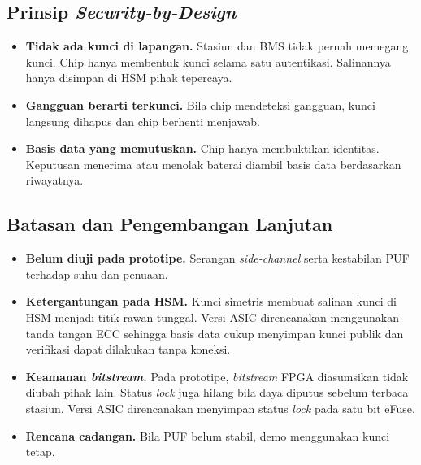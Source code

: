 \documentclass[11pt,a4paper]{article}
\begin{document}
\subsection{Prinsip \emph{Security-by-Design}}

\begin{itemize}
  \item \textbf{Tidak ada kunci di lapangan.} Stasiun dan BMS tidak pernah memegang kunci. Chip hanya membentuk kunci selama satu autentikasi. Salinannya hanya disimpan di HSM pihak tepercaya.
  \item \textbf{Gangguan berarti terkunci.} Bila chip mendeteksi gangguan, kunci langsung dihapus dan chip berhenti menjawab.
  \item \textbf{Basis data yang memutuskan.} Chip hanya membuktikan identitas. Keputusan menerima atau menolak baterai diambil basis data berdasarkan riwayatnya.
\end{itemize}

\subsection{Batasan dan Pengembangan Lanjutan}

\begin{itemize}
  \item \textbf{Belum diuji pada prototipe.} Serangan \emph{side-channel} serta kestabilan PUF terhadap suhu dan penuaan.
  \item \textbf{Ketergantungan pada HSM.} Kunci simetris membuat salinan kunci di HSM menjadi titik rawan tunggal. Versi ASIC direncanakan menggunakan tanda tangan ECC sehingga basis data cukup menyimpan kunci publik dan verifikasi dapat dilakukan tanpa koneksi.
  \item \textbf{Keamanan \emph{bitstream}.} Pada prototipe, \emph{bitstream} FPGA diasumsikan tidak diubah pihak lain. Status \emph{lock} juga hilang bila daya diputus sebelum terbaca stasiun. Versi ASIC direncanakan menyimpan status \emph{lock} pada satu bit eFuse.
  \item \textbf{Rencana cadangan.} Bila PUF belum stabil, demo menggunakan kunci tetap.
\end{itemize}

\clearpage
\end{document}
